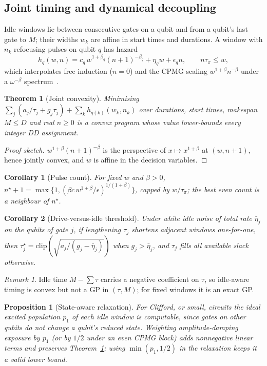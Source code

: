 \documentclass[10pt,journal]{IEEEtran}
\newtheorem{theorem}{Theorem}
\newtheorem{proposition}{Proposition}
\newtheorem{corollary}{Corollary}
\theoremstyle{remark}
\newtheorem{remark}{Remark}
\begin{document}
\subsection{Joint timing and dynamical decoupling}
Idle windows lie between consecutive gates on a qubit and from a qubit's last gate to $M$; their widths
$w_k$ are affine in start times and durations. A window with $n_k$ refocusing pulses on qubit $q$ has hazard
\begin{equation}\label{eq:window}
h_q(w,n)=c_q\,w^{1+\beta_q}(n+1)^{-\beta_q}+\eta_q w+\epsilon_q n,\qquad n\tau_\pi\le w,
\end{equation}
which interpolates free induction ($n=0$) and the CPMG scaling $w^{1+\beta}n^{-\beta}$ under a
$\omega^{-\beta}$ spectrum~\cite{cywinski2008}.
\begin{theorem}[Joint convexity]\label{thm:c2}
Minimising $\sum_j(a_j/\tau_j+g_j\tau_j)+\sum_k h_{q(k)}(w_k,n_k)$ over durations, start times, makespan
$M\le D$ and real $n\ge0$ is a convex program whose value lower-bounds every integer DD assignment.
\end{theorem}
\begin{proof}[Proof sketch]
$w^{1+\beta}(n+1)^{-\beta}$ is the perspective of $x\mapsto x^{1+\beta}$ at $(w,n+1)$, hence jointly convex,
and $w$ is affine in the decision variables.
\end{proof}
\begin{corollary}[Pulse count]\label{cor:n}
For fixed $w$ and $\beta>0$, $n^\star+1=\max\{1,(\beta c\,w^{1+\beta}/\epsilon)^{1/(1+\beta)}\}$, capped by
$w/\tau_\pi$; the best even count is a neighbour of $n^\star$.
\end{corollary}
\begin{corollary}[Drive-versus-idle threshold]\label{cor:threshold}
Under white idle noise of total rate $\bar\eta_j$ on the qubits of gate $j$, if lengthening $\tau_j$ shortens
adjacent windows one-for-one, then $\tau_j^\star=\mathrm{clip}(\sqrt{a_j/(g_j-\bar\eta_j)})$ when
$g_j>\bar\eta_j$, and $\tau_j$ fills all available slack otherwise.
\end{corollary}
\begin{remark}\label{rem:notgp}
Idle time $M-\sum\tau$ carries a negative coefficient on $\tau$, so idle-aware timing is convex but not a GP in
$(\tau,M)$; for fixed windows it is an exact GP.
\end{remark}
\begin{proposition}[State-aware relaxation]\label{prop:state}
For Clifford, or small, circuits the ideal excited population $p_1$ of each idle window is computable, since
gates on other qubits do not change a qubit's reduced state. Weighting amplitude-damping exposure by $p_1$
(or by $1/2$ under an even CPMG block) adds nonnegative linear terms and preserves Theorem~\ref{thm:c2}; using
$\min(p_1,1/2)$ in the relaxation keeps it a valid lower bound.
\end{proposition}
\end{document}
